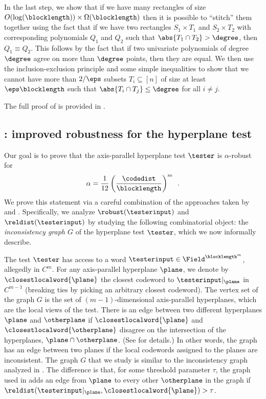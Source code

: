 \documentclass{toc}
\theoremstyle{plain}
\begin{document}
In the last step, we show that if we have many rectangles of size $O(\log(\blocklength)) \times \Omega(\blocklength)$ then it is possible to ``stitch'' them together using the fact that if we have two rectangles $S_1 \times T_1$ and $S_2 \times T_2$ with corresponding polynomials $Q_1$ and $Q_2$ such that $\abs{T_1 \cap T_2} > \degree$, then $Q_1 \equiv Q_2$. This follows by the fact that if two univariate polynomials of degree $\degree$ agree on more than $\degree$ points, then they are equal. We then use the inclusion-exclusion principle and some simple inequalities to show that we cannot have more than ${2}/{\eps}$ subsets $T_i \subseteq [n]$ of size at least $\eps\blocklength$ such that $\abs{T_i \cap T_j} \leq \degree$ for all $i \neq j$.

The full proof of  is provided in .

%
%
\subsection{: improved robustness for the hyperplane test}
\label{sec:techniques-1}

Our goal is to prove that the axis-parallel hyperplane test $\tester$ is $\alpha$-robust for
\[
  \alpha = \frac{1}{12} \left(\frac{\codedist}{\blocklength}\right)^m\enspace.
\]
We prove this statement via a careful combination of the approaches
taken by \cite{Ben-SassonS06} and \cite{Viderman12}. Specifically, we
analyze $\robust(\testerinput)$ and $\reldist(\testerinput)$ by
studying the following combinatorial object: the \emph{inconsistency
  graph $G$} of the hyperplane test $\tester$, which we now informally
describe.

The test $\tester$ has access to a word $\testerinput \in \Field^{\blocklength^m}$, allegedly in $C^{m}$. For any axis-parallel hyperplane $\plane$, we denote by $\closestlocalword{\plane}$ the closest codeword to $\testerinput \vert_{\plane}$ in $C^{m-1}$ (breaking ties by picking an arbitrary closest codeword). The vertex set of the graph $G$ is the set of $(m-1)$-dimensional axis-parallel hyperplanes, which are the local views of the test. There is an edge between two different hyperplanes $\plane$ and $\otherplane$ if $\closestlocalword{\plane}$ and $\closestlocalword{\otherplane}$ disagree on the intersection of the hyperplanes, $\plane \cap \otherplane$. (See  for details.) In other words, the graph has an edge between two planes if the local codewords assigned to the planes are inconsistent. The graph $G$ that we study is similar to the inconsistency graph analyzed in \cite{Ben-SassonS06}. The difference is that, for some threshold parameter $\tau$, the graph used in \cite{Ben-SassonS06} adds an edge from $\plane$ to every other $\otherplane$ in the graph if $\reldist(\testerinput \vert_{\plane},\closestlocalword{\plane}) > \tau$.
\end{document}

